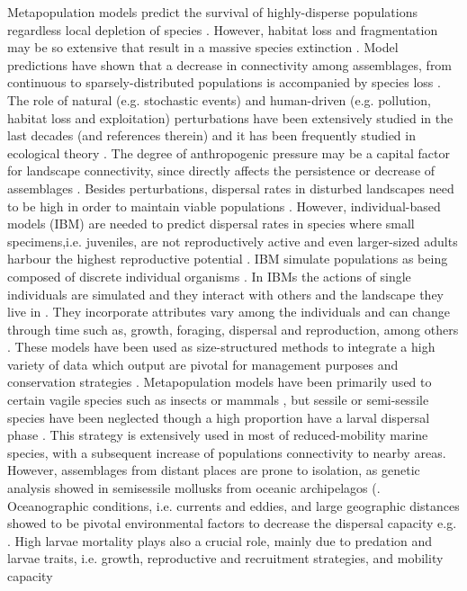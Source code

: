 \documentclass[12pt]{article}
\begin{document}
\begin{flushleft}
{{{{{Metapopulation models predict the survival of highly-disperse populations regardless local depletion of species \citep{hanski1999habitat,akccakaya2007role}. However, habitat loss and fragmentation may be so extensive that result in a massive species extinction \citep{montoya2008habitat,Rybicki and Hanksi,
2013,haddad2015habitat}. Model predictions have shown that a decrease in connectivity among assemblages, from continuous to sparsely-distributed populations is accompanied by species loss \citep{metzger2009time, niebuhr2015survival}. The role of natural (e.g. stochastic events) and human-driven (e.g. pollution, habitat loss and exploitation) perturbations have been extensively studied in the last decades (\citep{dornelas2010disturbance}and references therein) and it has been frequently studied in ecological theory \citep{volkov2007pattern, gardner2008spatial}. The degree of anthropogenic pressure may be a capital factor for landscape connectivity, since directly affects the persistence or decrease of assemblages \citep{supp2014species}. Besides perturbations, dispersal rates in disturbed landscapes need to be high in order to maintain viable populations \citep{provan2008high}. However, individual-based models (IBM) are needed to predict dispersal rates in species where small specimens,i.e. juveniles, are not reproductively active and even larger-sized adults harbour the highest reproductive potential \citep{hendriks2008scaling,  werner2011reproductive}. IBM simulate populations as being composed of discrete individual organisms \citep{deangelis2014individual, an2016predicting}. In IBMs the actions of single individuals are simulated and they interact with others and the landscape they live in \citep{deangelis2005individual}. They incorporate attributes vary among the individuals and can change through time such as, growth, foraging, dispersal and reproduction, among others \citep{martin2013predicting, deangelis2014individual}. These models have been used as size-structured methods to integrate a high variety of data which output are pivotal for management purposes \citep{punt2013review} and conservation strategies \citep{nabe2014effects}. Metapopulation models have been primarily used to certain vagile species such as insects \citep{harrison1995testing, hilker2006parameterizing}or mammals \citep{krohne1997dynamics, lawes2000patch}, but sessile or semi-sessile species have been neglected though a high proportion have a larval dispersal phase \citep{sale2006merging, gaggiotti2017metapopulations}. This strategy is extensively used in most of reduced-mobility marine species, with a subsequent increase of populations connectivity to nearby areas. However, assemblages from distant places are prone to isolation, as genetic analysis showed in semisessile mollusks from oceanic archipelagos (\citep{corte1996population, gaggiotti2017metapopulations, faria2017disentangling}. Oceanographic conditions, i.e. currents and eddies, and large geographic distances showed to be pivotal environmental factors to decrease the dispersal capacity e.g. \citep{palumbi1994genetic}. High larvae mortality plays also a crucial role, mainly due to predation and larvae traits, i.e. growth, reproductive and recruitment strategies, and mobility capacity \citep{cowen2000connectivity, }}}}}}
\end{flushleft}
\end{document}
